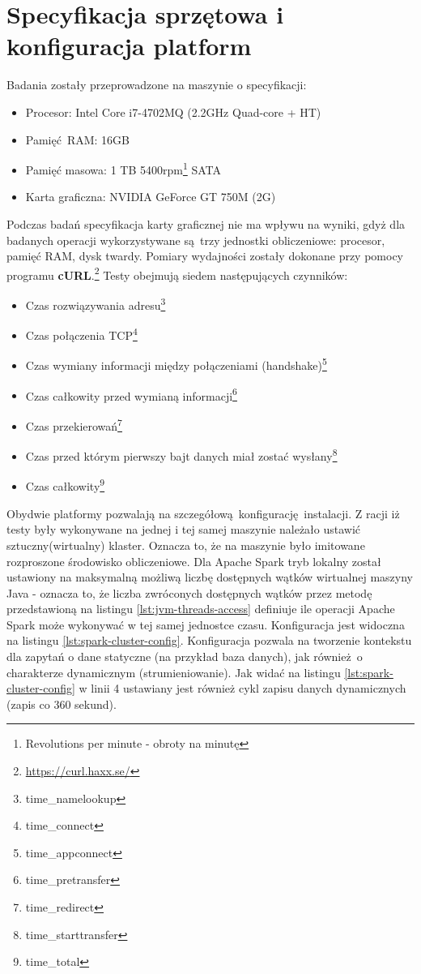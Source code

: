 \section{Specyfikacja sprzętowa i konfiguracja platform}
Badania zostały przeprowadzone na maszynie o specyfikacji:
\begin{itemize}
	\item Procesor: Intel Core i7-4702MQ (2.2GHz Quad-core + HT) 
	\item Pamięć RAM: 16GB
	\item Pamięć masowa: 1 TB 5400rpm\footnote{Revolutions per minute - obroty na minutę} SATA
	\item Karta graficzna: NVIDIA GeForce GT 750M (2G)  
\end{itemize}
Podczas badań specyfikacja karty graficznej nie ma wpływu na wyniki, gdyż dla badanych operacji wykorzystywane są trzy jednostki obliczeniowe: procesor, pamięć RAM, dysk twardy.
\newline Pomiary wydajności zostały dokonane przy pomocy programu \textbf{cURL}.\footnote{\url{https://curl.haxx.se/}} Testy obejmują siedem następujących czynników:
\begin{itemize}\label{items:time-descriptions}
	\item{Czas rozwiązywania adresu\footnote{time\_namelookup}}
	\item{Czas połączenia TCP\footnote{time\_connect}}
	\item{Czas wymiany informacji między połączeniami (handshake)\footnote{time\_appconnect}} 
	\item{Czas całkowity przed wymianą informacji\footnote{time\_pretransfer}}
	\item{Czas przekierowań\footnote{time\_redirect}}
	\item{Czas przed którym pierwszy bajt danych miał zostać wysłany\footnote{time\_starttransfer}}
	\item{Czas całkowity\footnote{time\_total}}
\end{itemize}
Obydwie platformy pozwalają na szczegółową konfigurację instalacji. Z racji iż testy były wykonywane na jednej i tej samej maszynie należało ustawić sztuczny(wirtualny) klaster. Oznacza to, że na maszynie było imitowane rozproszone środowisko obliczeniowe. Dla Apache Spark tryb lokalny został ustawiony na maksymalną możliwą liczbę dostępnych wątków wirtualnej maszyny Java - oznacza to, że liczba zwróconych dostępnych wątków przez metodę przedstawioną na listingu \ref{lst:jvm-threads-access} definiuje ile operacji Apache Spark może wykonywać w tej samej jednostce czasu. Konfiguracja jest widoczna na listingu \ref{lst:spark-cluster-config}. Konfiguracja pozwala na tworzenie kontekstu dla zapytań o dane statyczne (na przykład baza danych), jak również o charakterze dynamicznym (strumieniowanie). Jak widać na listingu \ref{lst:spark-cluster-config} w linii 4 ustawiany jest również cykl zapisu danych dynamicznych (zapis co 360 sekund).
